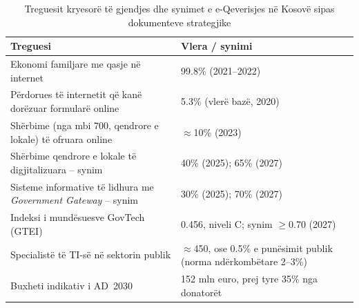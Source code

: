 \documentclass[conference]{IEEEtran}
\begin{document}
\begin{table}[!t]
\caption{Treguesit kryesorë të gjendjes dhe synimet e e-Qeverisjes në
Kosovë sipas dokumenteve strategjike}
\label{tab:treguesit}
\centering
\footnotesize
\renewcommand{\arraystretch}{1.2}
\begin{tabular}{L{0.56\columnwidth} L{0.34\columnwidth}}
\toprule
\textbf{Treguesi} & \textbf{Vlera / synimi} \\
\midrule
Ekonomi familjare me qasje në internet \cite{strategjia2023} &
99.8\% (2021--2022) \\
Përdorues të internetit që kanë dorëzuar formularë online
\cite{agjenda2030} & 5.3\% (vlerë bazë, 2020) \\
Shërbime (nga mbi 700, qendrore e lokale) të ofruara online
\cite{strategjia2023} & $\approx$10\% (2023) \\
Shërbime qendrore e lokale të digjitalizuara -- synim
\cite{strategjia2023} & 40\% (2025); 65\% (2027) \\
Sisteme informative të lidhura me \textit{Government Gateway} -- synim
\cite{strategjia2023} & 30\% (2025); 70\% (2027) \\
Indeksi i mundësuesve GovTech (GTEI) \cite{strategjia2023} &
0.456, niveli C; synim $\geq$0.70 (2027) \\
Specialistë të TI-së në sektorin publik \cite{strategjia2023} &
$\approx$450, ose 0.5\% e punësimit publik (norma ndërkombëtare 2--3\%) \\
Buxheti indikativ i AD~2030 \cite{agjenda2030} &
152 mln euro, prej tyre 35\% nga donatorët \\
\bottomrule
\end{tabular}
\end{table}
\end{document}

